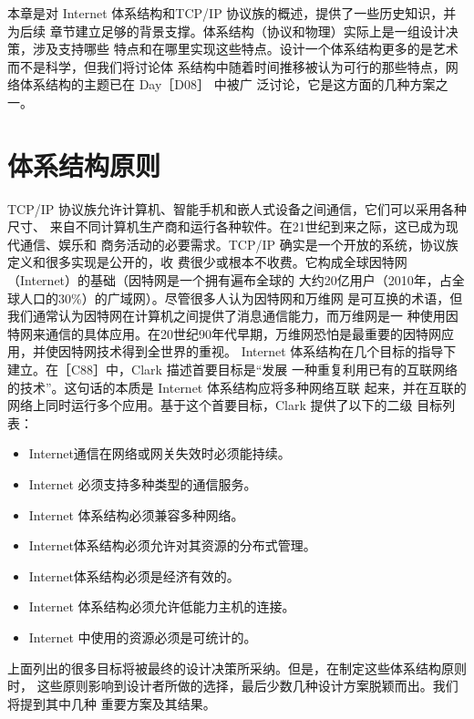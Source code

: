 本章是对 Internet 体系结构和TCP/IP 协议族的概述，提供了一些历史知识，并为后续
章节建立足够的背景支撑。体系结构（协议和物理）实际上是一组设计决策，涉及支持哪些
特点和在哪里实现这些特点。设计一个体系结构更多的是艺术而不是科学，但我们将讨论体
系结构中随着时间推移被认为可行的那些特点，网络体系结构的主题已在 Day［D08］ 中被广
泛讨论，它是这方面的几种方案之一。

\section{体系结构原则}
TCP/IP 协议族允许计算机、智能手机和嵌人式设备之间通信，它们可以采用各种尺寸、
来自不同计算机生产商和运行各种软件。在21世纪到来之际，这已成为现代通信、娱乐和
商务活动的必要需求。TCP/IP 确实是一个开放的系统，协议族定义和很多实现是公开的，收
费很少或根本不收费。它构成全球因特网（Internet）的基础（因特网是一个拥有遍布全球的
大约20亿用户（2010年，占全球人口的30\%）的广域网）。尽管很多人认为因特网和万维网
是可互换的术语，但我们通常认为因特网在计算机之间提供了消息通信能力，而万维网是一
种使用因特网来通信的具体应用。在20世纪90年代早期，万维网恐怕是最重要的因特网应
用，并使因特网技术得到全世界的重视。
Internet 体系结构在几个目标的指导下建立。在［C88］中，Clark 描述首要目标是“发展
一种重复利用已有的互联网络的技术”。这句话的本质是 Internet 体系结构应将多种网络互联
起来，并在互联的网络上同时运行多个应用。基于这个首要目标，Clark 提供了以下的二级
目标列表：
\begin{itemize}
    \item Internet通信在网络或网关失效时必须能持续。
    \item Internet 必须支持多种类型的通信服务。
    \item Internet 体系结构必须兼容多种网络。
    \item Internet体系结构必须允许对其资源的分布式管理。
    \item Internet体系结构必须是经济有效的。
    \item Internet 体系结构必须允许低能力主机的连接。
    \item Internet 中使用的资源必须是可统计的。
\end{itemize}
上面列出的很多目标将被最终的设计决策所采纳。但是，在制定这些体系结构原则时，
这些原则影响到设计者所做的选择，最后少数几种设计方案脱颖而出。我们将提到其中几种
重要方案及其结果。
